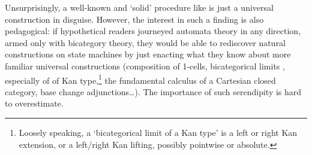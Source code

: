 Unsurprisingly, a well-known and `solid' procedure like \cite[3.1.4,3.1.5]{Shallit} is just a universal construction in disguise. However, the interest in such a finding is also pedagogical: if hypothetical readers journeyed automata theory in any direction, armed only with bicategory theory, they would be able to rediscover natural constructions on state machines by just enacting what they know about more familiar universal constructions (composition of 1-cells, bicategorical limits \cite{kelly_1989,Street19,bird1989flexible}, especially of of Kan type,\footnote{Loosely speaking, a `bicategorical limit of a Kan type' is a left or right Kan extension, or a left/right Kan lifting, possibly pointwise or absolute.} \cite{street1981conspectus} the fundamental calculus of a Cartesian closed category, base change adjunctions\dots). The importance of such serendipity is hard to overestimate.
